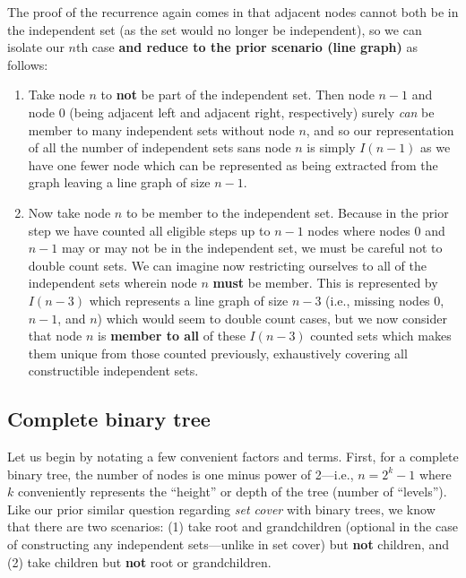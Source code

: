 \documentclass[conference]{styles/acmsiggraph}
\newcommand{\?}{\stackrel{?}{=}}
\begin{document}
The proof of the recurrence again comes in that adjacent nodes cannot both be in the independent set (as the set would no longer be independent), so we can isolate our $n$th case \textbf{and reduce to the prior scenario (line graph)} as follows:
\begin{enumerate}
    \item Take node $n$ to \textbf{not} be part of the independent set.  Then node $n-1$ and node $0$ (being adjacent left and adjacent right, respectively) surely \textit{can} be member to many independent sets without node $n$, and so our representation of all the number of independent sets sans node $n$ is simply $I(n-1)$ as we have one fewer node which can be represented as being extracted from the graph leaving a line graph of size $n-1$.
    \item Now take node $n$ to be member to the independent set.  Because in the prior step we have counted all eligible steps up to $n-1$ nodes where nodes $0$ and $n-1$ may or may not be in the independent set, we must be careful not to double count sets.  We can imagine now restricting ourselves to all of the independent sets wherein node $n$ \textbf{must} be member.  This is represented by $I(n-3)$ which represents a line graph of size $n-3$ (i.e., missing nodes $0$, $n-1$, and $n$) which would seem to double count cases, but we now consider that node $n$ is \textbf{member to all} of these $I(n-3)$ counted sets which makes them unique from those counted previously, exhaustively covering all constructible independent sets.
\end{enumerate}

\newpage
\subsection{Complete binary tree}
Let us begin by notating a few convenient factors and terms.  First, for a complete binary tree, the number of nodes is one minus power of 2---i.e., $n = 2^k - 1$ where $k$ conveniently represents the \enquote{height} or depth of the tree (number of 
\enquote{levels}).\\

Like our prior similar question regarding \textit{set cover} with binary trees, we know that there are two scenarios: (1) take root and grandchildren (optional in the case of constructing any independent sets---unlike in set cover) but \textbf{not} children, and (2) take children but \textbf{not} root or grandchildren.\\
\end{document}
